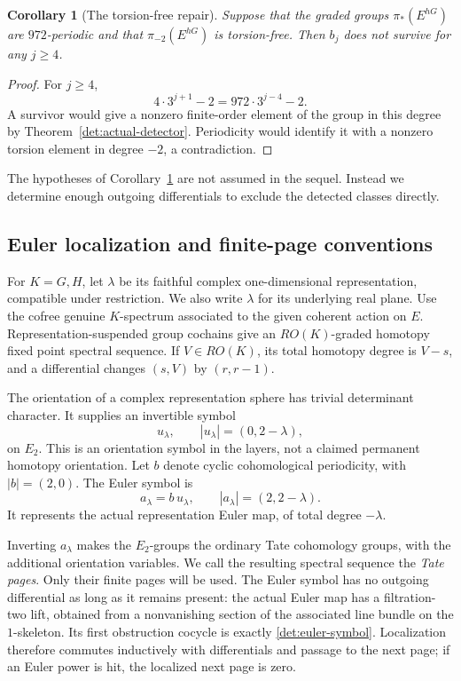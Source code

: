 \documentclass[11pt]{article}
\newtheorem{corollary}[theorem]{Corollary}
\theoremstyle{definition}
\theoremstyle{remark}
\numberwithin{equation}{section}
\begin{document}
\begin{corollary}[The torsion-free repair]\label{det:conditional-repair}
Suppose that the graded groups \(\pi_*(E^{hG})\) are
\(972\)-periodic and that \(\pi_{-2}(E^{hG})\) is
torsion-free.  Then \(b_j\) does not survive for any
\(j\geq4\).
\end{corollary}

\begin{proof}
For \(j\geq4\),
\[
 4\cdot3^{j+1}-2=972\cdot3^{j-4}-2.
\]
A survivor would give a nonzero finite-order element of the
group in this degree by Theorem~\ref{det:actual-detector}.
Periodicity would identify it with a nonzero torsion element
in degree \(-2\), a contradiction.
\end{proof}

The hypotheses of Corollary~\ref{det:conditional-repair} are not
assumed in the sequel.  Instead we determine enough outgoing
differentials to exclude the detected classes directly.

\subsection{Euler localization and finite-page conventions}

For \(K=G,H\), let \(\lambda\) be its faithful complex
one-dimensional representation, compatible under restriction.
We also write \(\lambda\) for its underlying real plane.
Use the cofree genuine \(K\)-spectrum associated to the given
coherent action on \(E\).  Representation-suspended group
cochains give an \(RO(K)\)-graded homotopy fixed point spectral
sequence.  If \(V\in RO(K)\), its total homotopy degree is
\(V-s\), and a differential changes \((s,V)\) by
\((r,r-1)\).

The orientation of a complex representation sphere has trivial
determinant character.  It supplies an invertible symbol
\[
 u_\lambda,\qquad |u_\lambda|=(0,2-\lambda),
\]
on \(E_2\).  This is an orientation symbol in the layers,
not a claimed permanent homotopy orientation.
Let \(b\) denote cyclic cohomological periodicity, with
\(|b|=(2,0)\).  The Euler symbol is
\begin{equation}\label{det:euler-symbol}
 a_\lambda=b\,u_\lambda,\qquad
 |a_\lambda|=(2,2-\lambda).
\end{equation}
It represents the actual representation Euler map, of total
degree \(-\lambda\).

Inverting \(a_\lambda\) makes the \(E_2\)-groups the ordinary
Tate cohomology groups, with the additional orientation
variables.  We call the resulting spectral sequence the
\emph{Tate pages}.  Only their finite pages will be used.
The Euler symbol has no outgoing differential as long as it
remains present: the actual Euler map has a filtration-two
lift, obtained from a nonvanishing section of the associated
line bundle on the \(1\)-skeleton.  Its first obstruction
cocycle is exactly \eqref{det:euler-symbol}.
Localization therefore commutes inductively with differentials
and passage to the next page; if an Euler power is hit, the
localized next page is zero.
\end{document}
